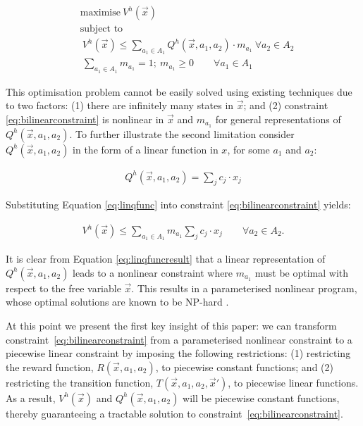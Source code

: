 {\small 
\abovedisplayskip=0pt
\belowdisplayskip=0pt
\begin{subequations}
\begin{align}
&\text{maximise}   \  V^{h}(\vec{x}) \nonumber \\
&\text{subject to}   \nonumber \\
&\   V^{h}(\vec{x}) \leq \sum_{a_1 \in A_1} Q^{h}(\vec{x}, a_1, a_2) \cdot m_{a_{1}} \   \forall a_2 \in A_2 \label{eq:bilinearconstraint} \\
                          &\  \sum_{a_{1} \in A_1} m_{a_{1}} = 1 ; \  m_{a_{1}} \geq 0 \qquad \forall a_{1} \in A_1 \nonumber
\end{align}
\end{subequations}
}%

This optimisation problem cannot be easily solved using existing techniques
due to two factors: (1) there are infinitely many states in $\vec{x}$; and
(2) constraint \eqref{eq:bilinearconstraint} is nonlinear in $\vec{x}$ and 
$m_{a_{1}}$ for general representations of {\small $Q^{h}(\vec{x}, a_1, a_2)$}. 
To further illustrate the second limitation consider {\small $Q^{h}(\vec{x}, a_1, a_2)$} in the 
form of a linear function in $x$, for some $a_1$ and $a_2$:

{\small 
\abovedisplayskip=0pt
\belowdisplayskip=0pt
\begin{align}
Q^{h}(\vec{x}, a_1, a_2) = \sum_{j} c_j \cdot x_j \label{eq:linqfunc}
\end{align}
}%

Substituting Equation \eqref{eq:linqfunc} into constraint \eqref{eq:bilinearconstraint}
yields:

{\small 
\abovedisplayskip=0pt
\belowdisplayskip=0pt
\begin{align}
V^{h}(\vec{x}) \leq \sum_{a_1 \in A_1} m_{a_{1}} \sum_{j} c_j \cdot x_j \qquad \forall a_2 \in A_2. \label{eq:linqfuncresult}
\end{align}
}%

It is clear from Equation \eqref{eq:linqfuncresult} that a linear representation
of {\small $Q^{h}(\vec{x}, a_1, a_2)$} leads to a nonlinear constraint
where $m_{a_{1}}$ must be optimal with respect to the free variable
$\vec{x}$. This results in a parameterised nonlinear program, whose optimal solutions are known to be
NP-hard \cite{Bennett_COA_1993,Petrik_JoMLR_2011}.

At this point we present the first key insight of this paper: we can 
transform constraint~\eqref{eq:bilinearconstraint} from a 
parameterised nonlinear constraint to a piecewise linear constraint by 
imposing the following restrictions: (1) restricting the reward function, 
{\small $R(\vec{x}, a_1, a_2)$}, to piecewise constant functions; and 
(2) restricting the transition function, 
{\small $T(\vec{x}, a_1, a_2, \vec{x}')$}, to piecewise linear functions. 
As a result, {\small $V^{h}(\vec{x})$} and 
{\small $Q^{h}(\vec{x}, a_1, a_2)$} will be piecewise constant functions, thereby
guaranteeing a tractable solution to constraint~\eqref{eq:bilinearconstraint}.

